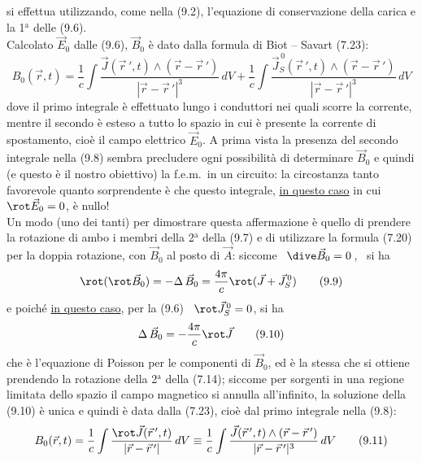 si effettua utilizzando, come nella (9.2), l'equazione di conservazione della
carica e la 1$^\mathrm{a}$ delle (9.6).\\
Calcolato $\vec E_0$ dalle (9.6), $\vec B_0$ \`e dato dalla formula di Biot --
Savart (7.23):
\begin{equation}
  B_0(\vec r,t)=\frac{1}{c}\int
  \frac{\vec J(\vec r\,',t)\wedge(\vec r-\vec r\,')}{|\vec r-\vec r\,'|^3}\,dV
  +\frac{1}{c}\int\frac{\vec J_S^{\,0}(\vec r\,',t)\wedge(\vec r-\vec r\,')}
  {|\vec r-\vec r\,'|^3}\,dV
  \tag{9.8}
\end{equation}
dove il primo integrale \`e effettuato lungo i conduttori nei quali scorre la
corrente, mentre il secondo \`e esteso a tutto lo spazio in cui \`e presente la
corrente di spostamento, cio\`e il campo elettrico $\vec E_0$. A prima vista la
presenza del secondo integrale nella (9.8) sembra precludere ogni possibilit\`a
di determinare $\vec B_0$ e quindi (e questo \`e il nostro obiettivo) la
f.e.m.\ in un circuito: la circostanza tanto favorevole quanto sorprendente \`e
che questo integrale, \underline{in questo caso} in cui \ $\rot\vec E_0=0$, \`e
nullo!\\
Un modo (uno dei tanti) per dimostrare questa affermazione \`e quello di
prendere la rotazione di ambo i membri della 2$^\mathrm{a}$ della (9.7) e di
utilizzare la formula (7.20) per la doppia rotazione, con $\vec B_0$ al posto di
$\vec A$: siccome \ $\dive\vec B_0=0$\,, \ si ha
\begin{equation}
  \rot(\rot\vec B_0)=-\Delta\,\vec B_0=\frac{4\pi}{c}\rot(\vec J+\vec J_S^{\,0})
  \tag{9.9}
\end{equation}
e poich\'e \underline{in questo caso}, per la (9.6) \ $\rot\vec J_S^{\,0}=0$, si
ha
\begin{equation}
  \Delta\,\vec B_0=-\frac{4\pi}{c}\rot\vec J
  \tag{9.10}
\end{equation}
che \`e l'equazione di Poisson per le componenti di $\vec B_0$, ed \`e la stessa
che si ottiene prendendo la rotazione della 2$^\mathrm{a}$ della (7.14); siccome
per sorgenti in una regione limitata dello spazio il campo magnetico si annulla
all'infinito, la soluzione della (9.10) \`e unica e quindi \`e data dalla
(7.23), cio\`e dal primo integrale nella (9.8):
\begin{equation}
  B_0(\vec r,t)
  =\frac{1}{c}\int\frac{\rot\vec J(\vec r\,',t)}{|\vec r-\vec r\,'|}\,dV
  \equiv\frac{1}{c}\int\frac{\vec J(\vec r\,',t)\wedge(\vec r-\vec r\,')}
  {|\vec r-\vec r\,'|^3}\,dV
  \tag{9.11}
\end{equation}
